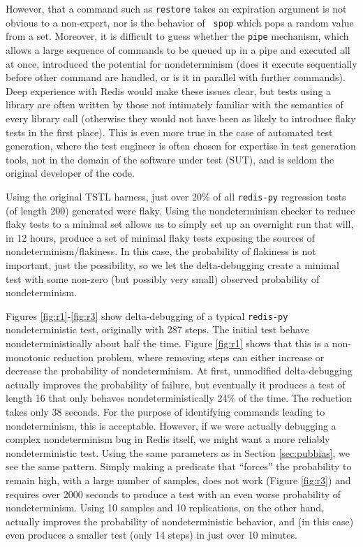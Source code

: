 However, that a command such as {\tt restore} takes an expiration
argument is not obvious to a non-expert, nor is the behavior of {\tt
  spop} which pops a random value from a set.  Moreover, it is
difficult to guess whether the {\tt pipe} mechanism, which allows a
large sequence of commands to be queued up in a pipe and executed all
at once, introduced the potential for nondeterminism (does it execute
sequentially before other command are handled, or is it in parallel
with further commands).  Deep experience with Redis would make these
issues clear, but tests using a library are often written by those not
intimately familiar with the semantics of every library call (otherwise they would not have
been as likely to introduce flaky tests in the first place).  This is
even more true in the case of automated test generation, where the
test engineer is often chosen for expertise in test generation tools,
not in the domain of the software under test (SUT), and is seldom the
original developer of the code.

Using the original TSTL harness, just over 20\% of all {\tt redis-py}
regression tests (of length 200) generated were flaky.  Using the
nondeterminism checker to reduce flaky tests to a minimal set allows
us to simply set up an overnight run that will, in 12 hours, produce
a set of minimal flaky tests exposing the sources of
nondeterminism/flakiness.  In this case, the probability of flakiness
is not important, just the possibility, so we let the delta-debugging
create a minimal test with some non-zero (but possibly very small)
observed probability of nondeterminism.

Figures \ref{fig:r1}-\ref{fig:r3} show delta-debugging of a typical
{\tt redis-py} nondeterministic test, originally with 287 steps.  The initial test behave
nondeterministically about half the time.  Figure \ref{fig:r1} shows
that this is a non-monotonic reduction problem, where removing steps
can either increase or decrease the probability of nondeterminism.  At
first, unmodified delta-debugging actually improves the probability of
failure, but eventually it produces a test of length 16 that only behaves
nondeterministically 24\% of the time.  The reduction takes only 38
seconds.  For the purpose of identifying commands leading to
nondeterminism, this is acceptable.  However, if we were actually
debugging a complex nondeterminism bug in Redis itself, we might want
a more reliably nondeterministic test.  Using the same parameters as
in Section \ref{sec:pubbias}, we see the same pattern.  Simply making
a predicate that ``forces'' the probability to remain high, with a
large number of samples, does not work (Figure \ref{fig:r3}) and
requires over 2000 seconds to produce a test with an even worse
probability of nondeterminism.  Using 10 samples and 10 replications,
on the other hand, actually improves the probability of
nondeterministic behavior, and
(in this case) even produces a smaller test (only 14 steps) in just
over 10 minutes.

